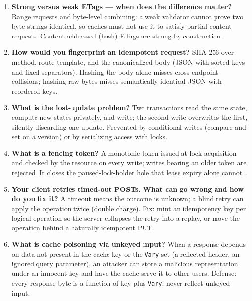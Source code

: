 \begin{enumerate}[label=\textbf{Q\arabic*.}, leftmargin=1.6cm, start=11]
        error, the cache may serve the stale entry within the window.
        \texttt{must-revalidate} disables this escape hatch --- choose it
        when a stale answer is worse than an error (e.g.\ account
        balances).
  \item \textbf{Strong versus weak ETags --- when does the difference
        matter?}
        Range requests and byte-level combining: a weak validator cannot
        prove two byte strings identical, so caches must not use it to
        satisfy partial-content requests. Content-addressed (hash) ETags
        are strong by construction.
  \item \textbf{How would you fingerprint an idempotent request?}
        SHA-256 over method, route template, and the canonicalized body
        (JSON with sorted keys and fixed separators). Hashing the body
        alone misses cross-endpoint collisions; hashing raw bytes misses
        semantically identical JSON with reordered keys.
  \item \textbf{What is the lost-update problem?}
        Two transactions read the same state, compute new states privately,
        and write; the second write overwrites the first, silently
        discarding one update. Prevented by conditional writes
        (compare-and-set on a version) or by serializing access with locks.
  \item \textbf{What is a fencing token?}
        A monotonic token issued at lock acquisition and checked by the
        resource on every write; writes bearing an older token are
        rejected. It closes the paused-lock-holder hole that lease expiry
        alone cannot~\cite{kleppmann2017ddia}.
  \item \textbf{Your client retries timed-out POSTs. What can go wrong and
        how do you fix it?}
        A timeout means the outcome is unknown; a blind retry can apply the
        operation twice (double charge). Fix: mint an idempotency key per
        logical operation so the server collapses the retry into a replay,
        or move the operation behind a naturally idempotent PUT.
  \item \textbf{What is cache poisoning via unkeyed input?}
        When a response depends on data not present in the cache key or the
        \texttt{Vary} set (a reflected header, an ignored query
        parameter), an attacker can store a malicious representation under
        an innocent key and have the cache serve it to other users.
        Defense: every response byte is a function of key plus
        \texttt{Vary}; never reflect unkeyed input.
\end{enumerate}

